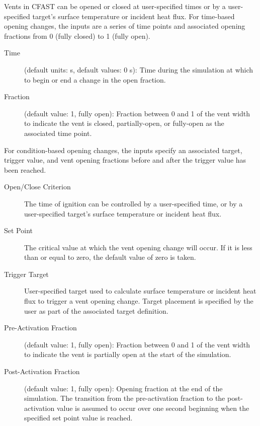 Vents in CFAST can be opened or closed at user-specified times or by a user-specified target's surface temperature or incident heat flux. For time-based opening changes, the inputs are a series of time points and associated opening fractions from 0 (fully closed) to 1 (fully open).

\begin{description}
\item[Time] (default units: s, default values: 0 s): Time during the simulation at which to begin or end a change in the open fraction.
\item[Fraction] (default value: 1, fully open): Fraction between 0 and 1 of the vent width to indicate the vent is closed, partially-open, or fully-open as the associated time point.
\end{description}

For condition-based opening changes, the inputs specify an associated target, trigger value, and vent opening fractions before and after the trigger value has been reached.

\begin{description}
\item[Open/Close Criterion] The time of ignition can be controlled by a user-specified time, or by a user-specified target's surface temperature or incident heat flux.
\item[Set Point] The critical value at which the vent opening change will occur. If it is less than or equal to zero, the default value of zero is taken.
\item[Trigger Target] User-specified target used to calculate surface temperature or incident heat flux to trigger a vent opening change. Target placement is specified by the user as part of the associated target definition.
\item[Pre-Activation Fraction] (default value: 1, fully open): Fraction between 0 and 1 of the vent width to indicate the vent is partially open at the start of the simulation.
\item[Post-Activation Fraction] (default value: 1, fully open): Opening fraction at the end of the simulation. The transition from the pre-activation fraction to the post-activation value is assumed to occur over one second beginning when the specified set point value is reached.
\end{description}





